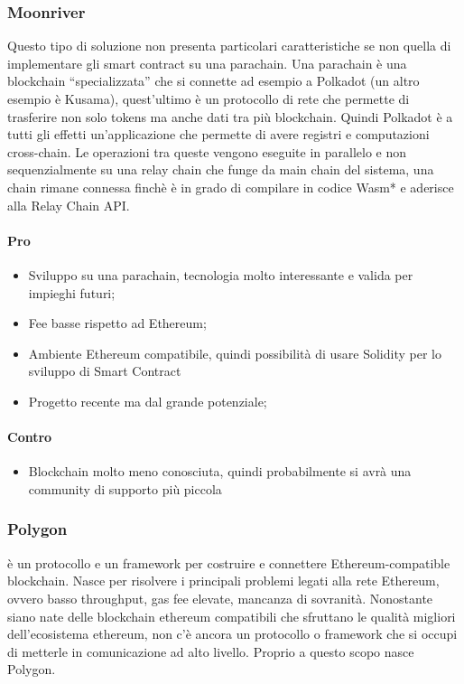     \subsubsection{Moonriver}
    Questo tipo di soluzione non presenta particolari caratteristiche se non quella di implementare gli smart contract su una parachain. Una parachain è una blockchain “specializzata” che si connette ad esempio a Polkadot (un altro esempio è Kusama), quest’ultimo è un protocollo di rete che permette di trasferire non solo tokens ma anche dati tra più blockchain. Quindi Polkadot è a tutti gli effetti un’applicazione che permette di avere registri e computazioni cross-chain.
    Le operazioni tra queste vengono eseguite in parallelo e non sequenzialmente su una relay chain che funge da main chain del sistema, una chain rimane connessa finchè è in grado di compilare in codice Wasm* e aderisce alla Relay Chain API.
    \paragraph{Pro}
    \begin{itemize}
        \item Sviluppo su una parachain, tecnologia molto interessante e valida per impieghi futuri;
        \item Fee basse rispetto ad Ethereum;
        \item Ambiente Ethereum compatibile, quindi possibilità di usare Solidity per lo sviluppo di Smart Contract
        \item Progetto recente ma dal grande potenziale;
    \end{itemize}
    \paragraph{Contro}
    \begin{itemize}
        \item Blockchain molto meno conosciuta, quindi probabilmente si avrà una community di supporto più piccola
    \end{itemize}
    
    \subsubsection{Polygon}
    è un protocollo e un framework per costruire e connettere Ethereum-compatible blockchain. Nasce per risolvere i principali problemi legati alla rete Ethereum, ovvero basso throughput, gas fee elevate, mancanza di sovranità.
    Nonostante siano nate delle blockchain ethereum compatibili che sfruttano le qualità migliori dell’ecosistema ethereum, non c’è ancora un protocollo o framework che si occupi di metterle in comunicazione ad alto livello. Proprio a questo scopo nasce Polygon.

